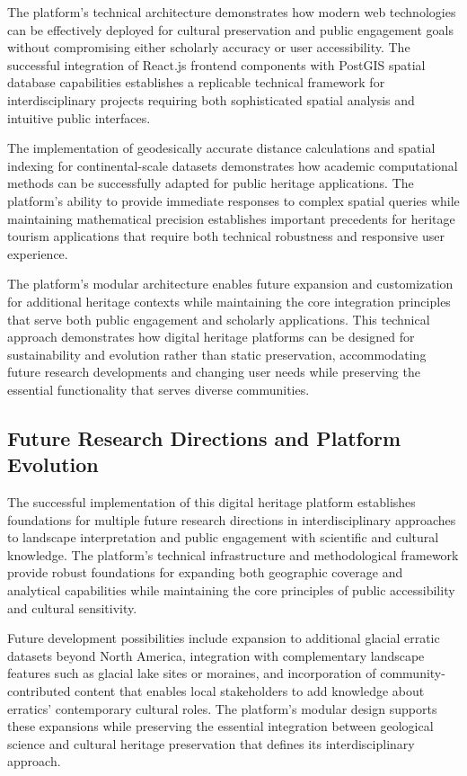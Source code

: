 The platform's technical architecture demonstrates how modern web technologies can be effectively deployed for cultural preservation and public engagement goals without compromising either scholarly accuracy or user accessibility. The successful integration of React.js frontend components with PostGIS spatial database capabilities establishes a replicable technical framework for interdisciplinary projects requiring both sophisticated spatial analysis and intuitive public interfaces.

The implementation of geodesically accurate distance calculations and spatial indexing for continental-scale datasets demonstrates how academic computational methods can be successfully adapted for public heritage applications. The platform's ability to provide immediate responses to complex spatial queries while maintaining mathematical precision establishes important precedents for heritage tourism applications that require both technical robustness and responsive user experience.

The platform's modular architecture enables future expansion and customization for additional heritage contexts while maintaining the core integration principles that serve both public engagement and scholarly applications. This technical approach demonstrates how digital heritage platforms can be designed for sustainability and evolution rather than static preservation, accommodating future research developments and changing user needs while preserving the essential functionality that serves diverse communities.

\subsection{Future Research Directions and Platform Evolution}
\label{subsec:future_directions}

The successful implementation of this digital heritage platform establishes foundations for multiple future research directions in interdisciplinary approaches to landscape interpretation and public engagement with scientific and cultural knowledge. The platform's technical infrastructure and methodological framework provide robust foundations for expanding both geographic coverage and analytical capabilities while maintaining the core principles of public accessibility and cultural sensitivity.

Future development possibilities include expansion to additional glacial erratic datasets beyond North America, integration with complementary landscape features such as glacial lake sites or moraines, and incorporation of community-contributed content that enables local stakeholders to add knowledge about erratics' contemporary cultural roles. The platform's modular design supports these expansions while preserving the essential integration between geological science and cultural heritage preservation that defines its interdisciplinary approach.

